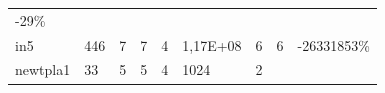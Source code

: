 \documentclass[italian,]{book}
\begin{document}
\begin{longtable}[]{@{}lllllllll@{}}
\begin{minipage}[t]{0.07\columnwidth}
-29\%\strut
\end{minipage}\tabularnewline
\begin{minipage}[t]{0.07\columnwidth}\raggedright
in5\strut
\end{minipage} & \begin{minipage}[t]{0.11\columnwidth}\raggedright
446\strut
\end{minipage} & \begin{minipage}[t]{0.08\columnwidth}\raggedright
7\strut
\end{minipage} & \begin{minipage}[t]{0.07\columnwidth}\raggedright
7\strut
\end{minipage} & \begin{minipage}[t]{0.09\columnwidth}\raggedright
4\strut
\end{minipage} & \begin{minipage}[t]{0.12\columnwidth}\raggedright
1,17E+08\strut
\end{minipage} & \begin{minipage}[t]{0.08\columnwidth}\raggedright
6\strut
\end{minipage} & \begin{minipage}[t]{0.07\columnwidth}\raggedright
6\strut
\end{minipage} & \begin{minipage}[t]{0.07\columnwidth}\raggedright
-26331853\%\strut
\end{minipage}\tabularnewline
\begin{minipage}[t]{0.07\columnwidth}\raggedright
newtpla1\strut
\end{minipage} & \begin{minipage}[t]{0.11\columnwidth}\raggedright
33\strut
\end{minipage} & \begin{minipage}[t]{0.08\columnwidth}\raggedright
5\strut
\end{minipage} & \begin{minipage}[t]{0.07\columnwidth}\raggedright
5\strut
\end{minipage} & \begin{minipage}[t]{0.09\columnwidth}\raggedright
4\strut
\end{minipage} & \begin{minipage}[t]{0.12\columnwidth}\raggedright
1024\strut
\end{minipage} & \begin{minipage}[t]{0.08\columnwidth}\raggedright
2\strut
\end{minipage} & \begin{minipage}[t]{0.07\columnwidth}\raggedright

\end{minipage}
\end{longtable}
\end{document}
